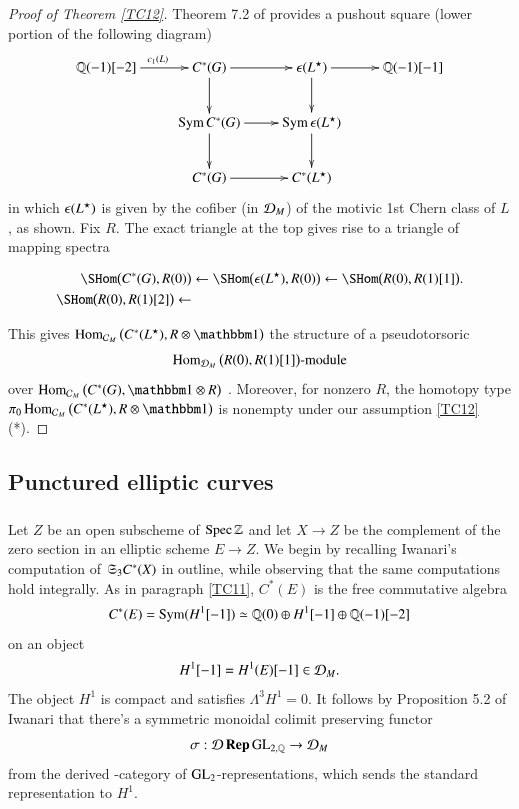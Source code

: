 \begin{proof}[Proof of Theorem \ref{TC12}]
Theorem 7.2 of \cite{DCBetts} provides a pushout square (lower portion of the following diagram)
\[
\xymatrix{
\QQ(-1)[-2] \ar[r]^{c_1(L)} & 
C^*(G) \ar[r] \ar[d] & 
\ep(L^\star) \ar[r] \ar[d] &
\QQ(-1)[-1] 
\\
& \Sym C^*(G) \ar[d] \ar[r] & 
\Sym \ep(L^\star) \ar[d]
\\
& C^*(G) \ar[r] & 
C^*(L^\star)
}
\]
in which $\epsilon(L^\star)$ is given by the cofiber (in $
\mathcal{D}_M$) of the motivic 1st Chern class of $L$, as shown. Fix $R$. The exact triangle at the top gives rise to a triangle of mapping spectra 
\begin{small}
\begin{align*}
\SHom \big( C^*(G), R(0) \big)
& \from
\SHom \big( \ep(L^\star), R(0) \big)
\from
\SHom \big( R(0), R(1)[1] \big).
\\
\SHom \big( R(0), R(1)[2] \big)
\from &
\end{align*}
\end{small}
This gives $\Hom_{\Cc_M}\big( C^*(L^\star), R \otimes \one \big)$ the structure of a pseudotorsoric
\[
\operatorname{Hom}_{\mathcal{D}_M} \big(R(0), R(1)[1] \big)\text{-module}
\]
over $\Hom_{\Cc_M} \big( C^*(G), \one \otimes R \big)$ \cite[\S3]{DCBetts}. Moreover, for nonzero $R$, the homotopy type $\pi_0\Hom_{\Cc_M}\big( C^*(L^\star), R \otimes \one \big)$ is nonempty under our assumption \ref{TC12}(*).
\end{proof}

\subsection{Punctured elliptic curves}
\label{sSec:Ell}



\subsubsection{}
\label{EB12}
Let $Z$ be an open subscheme of $\operatorname{Spec} \mathbb{Z}$ and let $X \to Z$ be the complement of the zero section in an elliptic scheme $E \to Z$. We begin by recalling Iwanari's computation of $\mathfrak{S}_3C^*(X)$ in outline, while observing that the same computations hold integrally. As in paragraph \ref{TC11}, $C^*(E)$ is the free commutative algebra
\[
C^*(E) = \operatorname{Sym} (H^1[-1]) \simeq 
\mathbb{Q}(0) \oplus H^1[-1] \oplus \mathbb{Q}(-1)[-2]
\]
on an object
\[
H^1[-1] = H^1(E)[-1] \in \mathcal{D}_M. 
\]
The object $H^1$ is compact and satisfies $\Lambda^3 H^1 = 0$. It follows by Proposition 5.2 of Iwanari \cite{Iwanari} that there's a symmetric monoidal colimit preserving functor
\[
\sigma:\mathcal{D} \operatorname{\bf{Rep}} \operatorname{GL}_{2, \mathbb{Q}} \to \mathcal{D}_M
\]
from the derived \oo-category of $\operatorname{GL}_2$-representations, which sends the standard representation to $H^1$.

